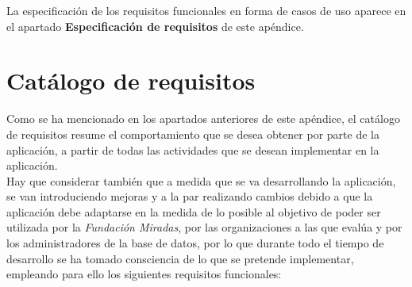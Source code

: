 	La especificación de los requisitos funcionales en forma de casos de uso
	aparece en el apartado \textbf{Especificación de requisitos} de este apéndice.

\section{Catálogo de requisitos}

Como se ha mencionado en los apartados anteriores de este apéndice, el catálogo
de requisitos resume el comportamiento que se desea obtener por parte de la
aplicación, a partir de todas las actividades que se desean implementar en la
aplicación.
\\
Hay que considerar también que a medida que se va desarrollando la aplicación,
se van introduciendo mejoras y a la par realizando cambios debido a que la
aplicación debe adaptarse en la medida de lo posible al objetivo de poder ser
utilizada por la \textit{Fundación Miradas}, por las organizaciones a las que
evalúa y por los administradores de la base de datos, por lo que durante todo el
tiempo de desarrollo se ha tomado consciencia de lo que se pretende implementar,
empleando para ello los siguientes requisitos funcionales:

